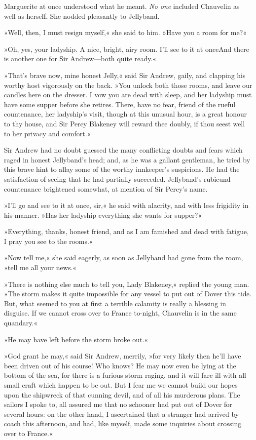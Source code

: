 Marguerite at once understood what he meant. \textit{No one} included Chauvelin as well as herself. She nodded pleasantly to Jellyband.

»Well, then, I must resign myself,« she said to him. »Have you a room for me?«

»Oh, yes, your ladyship. A nice, bright, airy room. I'll see to it at once\textellipsis \allowbreak  And there is another one for Sir Andrew—both quite ready.«

»That's brave now, mine honest Jelly,« said Sir Andrew, gaily, and clapping his worthy host vigorously on the back. »You unlock both those rooms, and leave our candles here on the dresser. I vow you are dead with sleep, and her ladyship must have some supper before she retires. There, have no fear, friend of the rueful countenance, her ladyship's visit, though at this unusual hour, is a great honour to thy house, and Sir Percy Blakeney will reward thee doubly, if thou seest well to her privacy and comfort.«

Sir Andrew had no doubt guessed the many conflicting doubts and fears which raged in honest Jellyband's head; and, as he was a gallant gentleman, he tried by this brave hint to allay some of the worthy innkeeper's suspicions. He had the satisfaction of seeing that he had partially succeeded. Jellyband's rubicund countenance brightened somewhat, at mention of Sir Percy's name.

»I'll go and see to it at once, sir,« he said with alacrity, and with less frigidity in his manner. »Has her ladyship everything she wants for supper?«

»Everything, thanks, honest friend, and as I am famished and dead with fatigue, I pray you see to the rooms.«

»Now tell me,« she said eagerly, as soon as Jellyband had gone from the room, »tell me all your news.«

»There is nothing else much to tell you, Lady Blakeney,« replied the young man. »The storm makes it quite impossible for any vessel to put out of Dover this tide. But, what seemed to you at first a terrible calamity is really a blessing in disguise. If we cannot cross over to France to-night, Chauvelin is in the same quandary.«

»He may have left before the storm broke out.«

»God grant he may,« said Sir Andrew, merrily, »for very likely then he'll have been driven out of his course! Who knows? He may now even be lying at the bottom of the sea, for there is a furious storm raging, and it will fare ill with all small craft which happen to be out. But I fear me we cannot build our hopes upon the shipwreck of that cunning devil, and of all his murderous plans. The sailors I spoke to, all assured me that no schooner had put out of Dover for several hours: on the other hand, I ascertained that a stranger had arrived by coach this afternoon, and had, like myself, made some inquiries about crossing over to France.«

